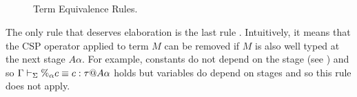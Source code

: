 \begin{figure}
	\begin{center}
		 \\[2mm]
		 \\[2mm]
		 \andalso
		 \\[2mm]
		 \\[2mm]
		 \andalso
		 \\[2mm]
		 \andalso
		 \\[2mm]
		 \\[2mm]
		 \\[2mm]
		 \\[2mm]
		 \hfil
		\caption{Term Equivalence Rules.}
		\label{fig:term-equivalence-rules}
	\end{center}
\end{figure}

The only rule that deserves elaboration is the last rule \QPercent.
Intuitively, it means that the CSP operator applied to term $M$ can be
removed if $M$ is also well typed at the next stage \(A\alpha\).
For example, constants do not depend on the stage (see \TConst) and
so \(\Gamma\vdash_\Sigma \%_\alpha c \equiv c : \tau @ A\alpha\) holds but variables
do depend on stages and so this rule does not apply.

